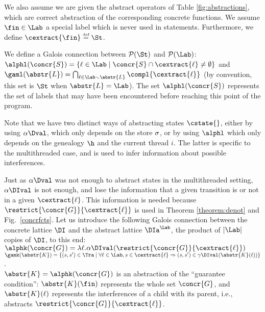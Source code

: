 \documentclass[12pt]{article}
\let\vide\emptyset \let\appartient\in
\let\firstinter\cap
\let\emptyset\vide \let\in\appartient
\let\cap\firstinter
\newcommand{\egdef}{\stackrel{\text{\tiny def}}{=}}
\renewcommand{\wp}{\mathcal{P}}
\newcounter{labels}[figure]
\newcommand{\fleche}{\mapsto}
\newcommand{\func}[2]{\lambda #1. #2 } \newcommand{\fx}[3]{#1[#2 \fleche #3]} \newcommand{\nf}[3]{#1\smallsetminus[#2 \fleche #3]}  \newcommand{\ndf}[2]{#1(#2)\uparrow}
\begin{document}
We also assume we are given the abstract operators of Table \ref{fig:abstractions}, which are correct abstraction of the corresponding concrete functions.
We assume \(\fin\in\Lab\) a special label which is never used in statements. Furthermore, we define \(\cextract{\fin}\egdef\St\).

We define a Galois connection between 
 \( \wp(\St) \) and \( \wp(\Lab) \):
\(\alphl(\concr{S}) = \{\ell \in\Lab\mid  \concr{S} \cap \cextract{\ell}\neq \emptyset \} \) and 
\(\gaml(\abstr{L}) = \bigcap_{\ell\in\Lab\smallsetminus\abstr{L}} \compl{\cextract{\ell}} \) (by convention, this set is \(\St\) when \(\abstr{L} = \Lab\)). The set \(\alphl(\concr{S})\) represents the set of labels that may have been encountered before reaching this point of the program.

Note that we have two distinct ways of abstracting states \(\cstate{}\), either by using \(\alpha\Dval\), which only depends  on the store \(\sigma\), or by using \(\alphl\) which only depends  on the genealogy \(\h\) and the current thread \(i\). The latter is specific to the multithreaded case, and is used to infer information about possible interferences.

Just as \(\alpha\Dval\) was not enough to abstract states in the multithreaded setting, \(\alpha\DIval\) is not enough, and lose the information that a given transition is or not in a given \(\cextract{\ell}\). This information is needed because \(\restrict{\concr{G}}{\cextract{\ell}}\) is used in Theorem \ref{theorem:denot} and Fig.~\ref{concrfcts}.
Let us introduce the following Galois connection between the concrete lattice \(\DI\) and the abstract lattice \(\DIa^{\Lab}\), the product of \( |\Lab| \) copies of \(\DI\), to this end:
\(\alphk(\concr{G}) = \func{\ell}{\alpha\DIval(\restrict{\concr{G}}{\cextract{\ell}})}\)\\
\(\gamk(\abstr{K}) = \{(s,s')\in\Tra\mid  \forall \ell\in\Lab, s\in\cextract{\ell} \Rightarrow (s,s') \in\gamma\DIval(\abstr{K}(\ell))  \} \).\\
\(\abstr{K}=\alphk(\concr{G})\) is an abstraction of the ``guarantee condition'': \(\abstr{K}(\fin)\) represents the whole set \(\concr{G}\), and \(\abstr{K}(\ell)\) represents the interferences of a child with its parent, i.e., abstracts  \(\restrict{\concr{G}}{\cextract{\ell}}\).
\end{document}
